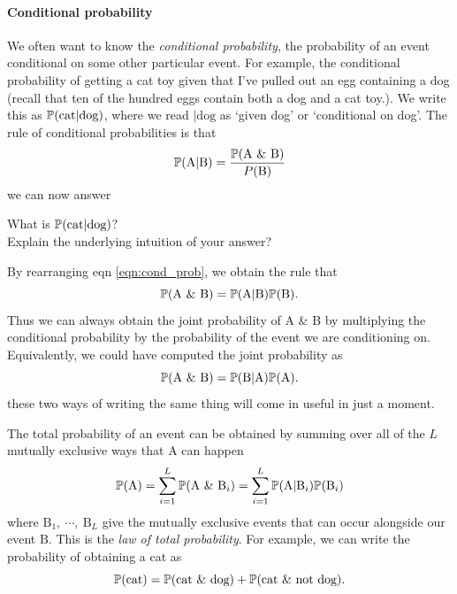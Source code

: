 \paragraph{Conditional probability}
We often want to know the \emph{conditional probability}, the probability of an event conditional on some
other particular event. For example, the conditional probability of getting a cat toy
given that I've pulled out an egg containing a dog (recall that ten of the hundred eggs contain both a dog and a cat toy.). 
We write this as $\P(\textrm{cat} | \textrm{dog})$, where we read $|
\textrm{dog}$ as `given dog' or `conditional on dog'.  The rule of conditional probabilities is that
\begin{equation}
\P(\textrm{A} | \textrm{B}) = \frac{\P(\textrm{A \& B} )}{P(\textrm{B})}  \label{eqn:cond_prob}
\end{equation}
we can now answer
\begin{question} \label{question:cond}
What is $ \P(\textrm{cat} | \textrm{dog})$?\\
Explain the underlying intuition of your answer? \\
\end{question}
By rearranging eqn \eqref{eqn:cond_prob}, we obtain the rule that
\begin{equation}
\P(\textrm{A \& B}) = \P(\textrm{A} | \textrm{B}) \P(\textrm{B}) .
\end{equation}
Thus we can always obtain the joint probability of A \& B by
multiplying the conditional probability by the probability of the
event we are conditioning on. Equivalently, we could have computed the
joint probability as
\begin{equation}
\P(\textrm{A \& B}) = \P(\textrm{B} | \textrm{A}) \P(\textrm{A}) .
\end{equation}
these two ways of writing the same thing will come in useful in just a
moment.

The total probability of an event can be obtained by summing over
all of the $L$ mutually exclusive ways that A can happen
\begin{equation}
  \P(\textrm{A})  = \sum_{i=1}^L \P(\textrm{A \& B$_i$}) = \sum_{i=1}^L \P(\textrm{A} | \textrm{B}_i) \P(\textrm{B}_i)  \label{eqn:law_tot_prob}
\end{equation}
where $\textrm{B}_1,~\cdots,~\textrm{B}_L$ give the mutually exclusive events
that can occur alongside our event $\textrm{B}$. This is the \emph{law of total
  probability}. For example, we can write the probability of obtaining
a cat as
\begin{equation}
 \P(\textrm{cat}) = \P(\textrm{cat \& dog}) + \P(\textrm{cat \& not dog}). 
\end{equation}

